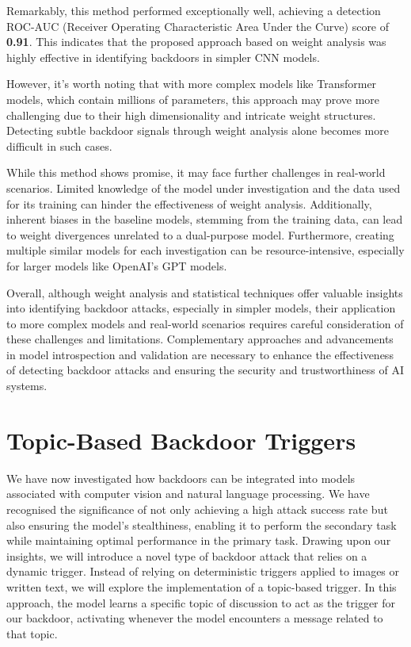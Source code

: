 Remarkably, this method performed exceptionally well, achieving a detection ROC-AUC (Receiver Operating Characteristic Area Under the Curve) score of \textbf{0.91}. This indicates that the proposed approach based on weight analysis was highly effective in identifying backdoors in simpler CNN models.

However, it's worth noting that with more complex models like Transformer models, which contain millions of parameters, this approach may prove more challenging due to their high dimensionality and intricate weight structures. Detecting subtle backdoor signals through weight analysis alone becomes more difficult in such cases.

While this method shows promise, it may face further challenges in real-world scenarios. Limited knowledge of the model under investigation and the data used for its training can hinder the effectiveness of weight analysis. Additionally, inherent biases in the baseline models, stemming from the training data, can lead to weight divergences unrelated to a dual-purpose model. Furthermore, creating multiple similar models for each investigation can be resource-intensive, especially for larger models like OpenAI's GPT models.

Overall, although weight analysis and statistical techniques offer valuable insights into identifying backdoor attacks, especially in simpler models, their application to more complex models and real-world scenarios requires careful consideration of these challenges and limitations. Complementary approaches and advancements in model introspection and validation are necessary to enhance the effectiveness of detecting backdoor attacks and ensuring the security and trustworthiness of AI systems.

\section{Topic-Based Backdoor Triggers}

We have now investigated how backdoors can be integrated into models associated with computer vision and natural language processing. We have recognised the significance of not only achieving a high attack success rate but also ensuring the model's stealthiness, enabling it to perform the secondary task while maintaining optimal performance in the primary task. Drawing upon our insights, we will introduce a novel type of backdoor attack that relies on a dynamic trigger. Instead of relying on deterministic triggers applied to images or written text, we will explore the implementation of a topic-based trigger. In this approach, the model learns a specific topic of discussion to act as the trigger for our backdoor, activating whenever the model encounters a message related to that topic. 